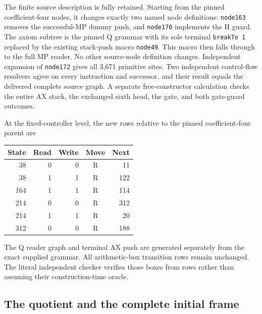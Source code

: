The finite source description is fully retained. Starting from the
pinned coefficient-four nodes, it changes exactly two named node
definitions: \texttt{node163} removes the successful-MP dummy push,
and \texttt{node170} implements the H guard. The axiom subtree is the
pinned Q grammar with its sole terminal \texttt{breakTo 1} replaced by
the existing stack-push macro \texttt{node49}. This macro then falls
through to the full MP reader. No other source-node definition changes.
Independent expansion of \texttt{node172} gives all 3,671 primitive sites.
Two independent control-flow resolvers agree on every instruction and
successor, and their result equals the delivered complete source graph.
A separate free-constructor calculation checks the entire AX stack,
the exchanged sixth head, the gate, and both gate-guard outcomes.

At the fixed-controller level, the new rows relative to the pinned
coefficient-four parent are
\begin{center}
\begin{tabular}{rrrcr}
\toprule
State & Read & Write & Move & Next\\
\midrule
38&0&0&R&11\\
38&1&1&R&122\\
164&1&1&R&114\\
214&0&0&R&312\\
214&1&1&R&20\\
312&0&0&R&188\\
\bottomrule
\end{tabular}
\end{center}
The Q reader graph and terminal AX push are generated separately from
the exact supplied grammar. All arithmetic-box transition rows remain
unchanged. The literal independent checker verifies those boxes from
rows rather than assuming their construction-time oracle.

\subsection{The quotient and the complete initial frame}

